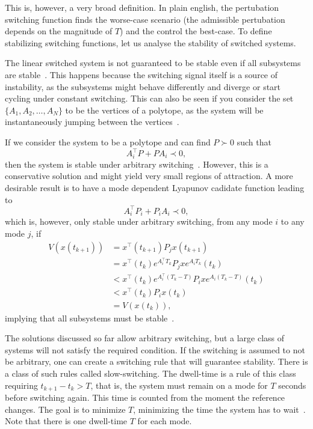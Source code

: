 This is, however, a very broad definition. In plain english, the pertubation
switching function finds the worse-case scenario (the admissible pertubation
depends on the magnitude of \(T\)) and the control the best-case. To define
stabilizing switching functions, let us analyse the stability of switched
systems.

The linear switched system is not guaranteed to be stable even if all subsystems
are stable~\parencite{liberzon.morse:basic}. This happens because the switching
signal itself is a source of instability, as the subsystems might behave
differently and diverge or start cycling under constant switching. This can also
be seen if you consider the set \(\{A_{1}, A_{2}, \ldots, A_{N}\}\) to be the
vertices of a polytope, as the system will be instantaneously jumping between
the vertices~\parencite{geromel.colaneri:stabilization}.

If we consider the system to be a polytope and can find \(P\succ{}0\) such that
%
\begin{equation}
  A_{i}^{\top}P+PA_{i} \prec{} 0,
\end{equation}
%
then the system is stable under arbitrary
switching~\parencite{geromel.deaecto:stability}. However, this is a conservative
solution and might yield very small regions of attraction. A more desirable
result is to have a mode dependent Lyapunov cadidate function leading to
%
\begin{equation}
  A_{i}^{\top}P_{i}+P_{i}A_{i} \prec{} 0,
\end{equation}
%
which is, however, only stable under arbitrary switching, from any mode \(i\) to
any mode \(j\), if
%
\begin{align}
  V(x(t_{k+1})) & = x^{\top}(t_{k+1})P_{j}x(t_{k+1})                                        \\
                & = x^{\top}(t_{k})e^{A^{\top}_{i}T_{k}}P_{j}xe^{A_{i}T_{k}}(t_{k})         \\
                & < x^{\top}(t_{k})e^{A^{\top}_{i}(T_{k}-T)}P_{i}xe^{A_{i}(T_{k}-T)}(t_{k}) \\
                & < x^{\top}(t_{k})P_{i}x(t_{k})                                            \\
                & = V(x(t_{k})),
\end{align}
%
implying that all subsystems must be
stable~\parencite{geromel.colaneri:stabilization}.

The solutions discussed so far allow arbitrary switching, but a large class of
systems will not satisfy the required condition. If the switching is assumed to
not be arbitrary, one can create a switching rule that will guarantee stability.
There is a class of such rules called slow-switching. The dwell-time is a rule
of this class requiring \(t_{k+1}-t_{k}>T\), that is, the system must remain on
a mode for \(T\) seconds before switching again. This time is counted from the
moment the reference changes. The goal is to minimize \(T\), minimizing the time
the system has to
wait~\parencite{chesi.colaneri.ea:computing,franzè.lucia.ea:command,liberzon.morse:basic}.
Note that there is one dwell-time \(T\) for each mode.

